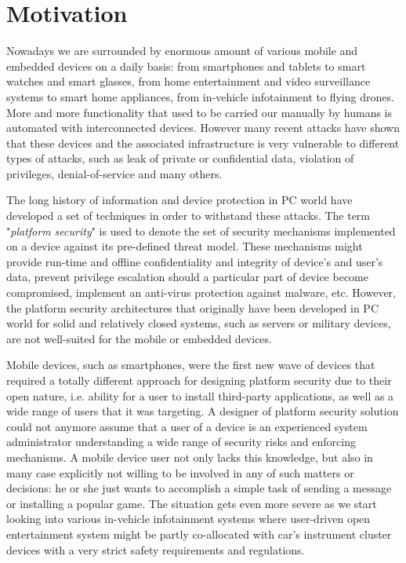 \begin{quoting}
\end{quoting}

\section{Motivation}

Nowadays we are surrounded by enormous amount of various mobile and embedded devices on a daily basis: from smartphones and tablets to smart watches and smart glasses, from home entertainment and video surveillance systems to smart home appliances, from in-vehicle infotainment to flying drones. More and more functionality that used to be carried our manually by humans is automated with interconnected devices. However many recent attacks have shown that these devices and the associated infrastructure is very vulnerable to different types of attacks, such as leak of private or confidential data, violation of privileges, denial-of-service and many others. 

The long history of information and device protection in PC world have developed a set of techniques in order to withstand these attacks. The term "\textit{platform security}" is used to denote the set of security mechanisms implemented on a device against its pre-defined threat model. These mechanisms might provide run-time and offline confidentiality and integrity of device's and user's data, prevent privilege escalation should a particular part of device become compromised, implement an anti-virus protection against malware, etc. However, the platform security architectures that originally have been developed in PC world for solid and relatively closed systems, such as servers or military devices, are not well-suited for the mobile or embedded devices. 

Mobile devices, such as smartphones, were the first new wave of devices that required a totally different approach for designing platform security due to their open nature, i.e. ability for a user to install third-party applications, as well as a wide range of users that it was targeting. A designer of platform security solution could not anymore assume that a user of a device is an experienced system administrator understanding a wide range of security risks and enforcing mechanisms. A mobile device user not only lacks this knowledge, but also in many case explicitly not willing to be involved in any of such matters or decisions: he or she just wants to accomplish a simple task of sending a message or installing a popular game. The situation gets even more severe as we start looking into various in-vehicle infotainment systems where user-driven open entertainment system might be partly co-allocated with car's instrument cluster devices with a very strict safety requirements and regulations. 

